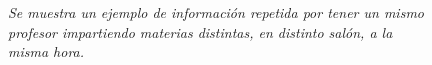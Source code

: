 \begin{itemize}





\begin{figure}[H]
	\centering
	\caption[\textit{Información repetida: Mismo profesor, misma hora, materias distintas}]{\textit{Se muestra un ejemplo de información repetida por tener un mismo profesor impartiendo materias distintas, en distinto salón, a la misma hora.}}\label{UnProfMuchasMaterias}
\end{figure}	

\end{itemize}
